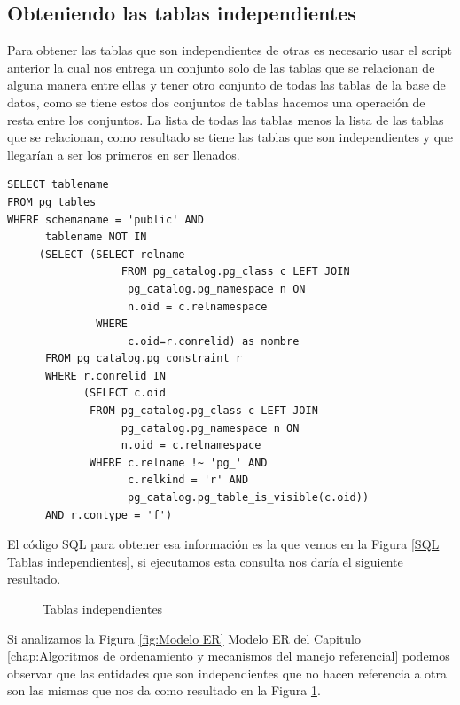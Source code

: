 \subsection{Obteniendo las tablas independientes}
Para obtener las tablas que son independientes de otras es necesario usar el script anterior la cual nos entrega un conjunto solo de las tablas que se relacionan de alguna manera entre ellas y tener otro conjunto de todas las tablas de la base de datos, como se tiene estos dos conjuntos de tablas hacemos una operaci\'on de resta entre los conjuntos. La lista de todas las tablas menos la lista de las tablas que se relacionan, como resultado se tiene las tablas que son independientes y que llegar\'ian a ser los primeros en ser llenados.
\lstset{language=sql,breaklines=true}
\label{SQL Tablas independientes}
\begin{lstlisting}
SELECT tablename
FROM pg_tables
WHERE schemaname = 'public' AND
      tablename NOT IN
     (SELECT (SELECT relname 
      		      FROM pg_catalog.pg_class c LEFT JOIN
                   pg_catalog.pg_namespace n ON 
                   n.oid = c.relnamespace 
              WHERE
                   c.oid=r.conrelid) as nombre
      FROM pg_catalog.pg_constraint r 
      WHERE r.conrelid IN
            (SELECT c.oid
             FROM pg_catalog.pg_class c LEFT JOIN
                  pg_catalog.pg_namespace n ON 
                  n.oid = c.relnamespace 
             WHERE c.relname !~ 'pg_' AND 
                   c.relkind = 'r' AND 
                   pg_catalog.pg_table_is_visible(c.oid))
      AND r.contype = 'f')
\end{lstlisting}
El c\'odigo SQL para obtener esa informaci\'on es la que vemos en la Figura \ref{SQL Tablas independientes}, si ejecutamos esta consulta nos dar\'ia el siguiente resultado.

\begin{figure}[H]
\centering
{}
\caption{Tablas independientes} \label{fig:Tablas independientes}
\end{figure}

Si analizamos la Figura \ref{fig:Modelo ER} Modelo ER del Capitulo \ref{chap:Algoritmos de ordenamiento y mecanismos del manejo referencial} podemos observar que las entidades que son independientes que no hacen referencia a otra son las mismas que nos da como resultado en la Figura \ref{fig:Tablas independientes}.

